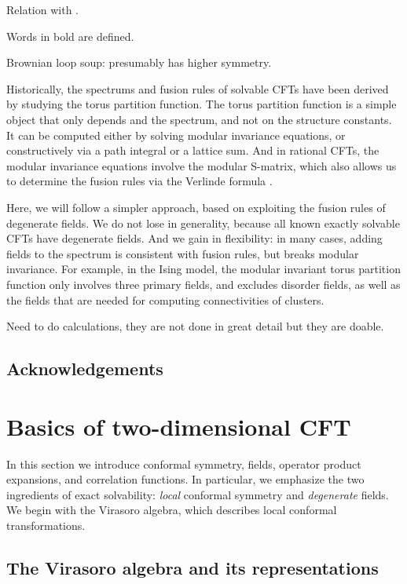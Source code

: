 \documentclass[12pt, a4paper]{article}
\theoremstyle{break}
\begin{document}
Relation with \cite{rib16}.

Words in bold are defined.


Brownian loop soup: presumably has higher symmetry.

Historically, the spectrums and fusion rules of solvable CFTs have been derived by studying the torus partition function. The torus partition function is a simple object that only depends and the spectrum, and not on the structure constants. It can be computed either by solving modular invariance equations, or constructively via a path integral or a lattice sum. And in rational CFTs, the modular invariance equations involve the modular S-matrix, which also allows us to determine the fusion rules via the Verlinde formula \cite{fms97}.

Here, we will follow a simpler approach, based on exploiting the fusion rules of degenerate fields. We do not lose in generality, because all known exactly solvable CFTs have degenerate fields. And we gain in flexibility: in many cases, adding fields to the spectrum is consistent with fusion rules, but breaks modular invariance. For example, in the Ising model, the modular invariant torus partition function only involves three primary fields, and excludes disorder fields, as well as the fields that are needed for computing connectivities of clusters.

Need to do calculations, they are not done in great detail but they are doable. 

\subsection*{Acknowledgements}



\section{Basics of two-dimensional CFT}\label{sec:bo}

In this section we introduce conformal symmetry, fields, operator product expansions, and correlation functions. In particular, we emphasize the two ingredients of exact solvability: \textit{local} conformal symmetry and \textit{degenerate} fields. We begin with the Virasoro algebra, which describes local conformal transformations. 

\subsection{The Virasoro algebra and its representations}\label{sec:vir}
\end{document}
